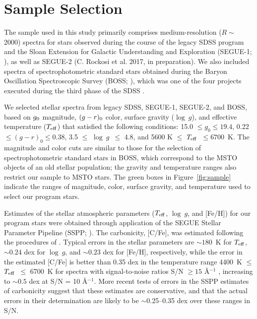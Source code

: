 \documentclass[iop]{emulateapj}
\newcommand*{\teff}{$T_{\rm eff}$}
\newcommand*{\logg}{$\log~g$}
\newcommand*{\feh}{[Fe/H]}
\newcommand*{\cfe}{[C/Fe]}
\begin{document}
\section{Sample Selection}

The sample used in this study primarily comprises medium-resolution ($R
\sim$ 2000) spectra for stars observed during the course of the legacy
SDSS program and the Sloan Extension for Galactic Understanding and
Exploration (SEGUE-1; \citealt{yanny2009}), as well as SEGUE-2 (C. Rockosi
et al. 2017, in preparation). We also included spectra of spectrophotometric
standard stars obtained during the Baryon Oscillation Spectroscopic
Survey (BOSS; \citealt{dawson2013}), which was one of the four projects
executed during the third phase of the SDSS \citep{alam2015}.

We selected stellar spectra from legacy SDSS, SEGUE-1, SEGUE-2, and
BOSS, based on $g_{\rm 0}$ magnitude, $(g-r) _{\rm 0}$ color, surface
gravity (\logg), and effective temperature (\teff) that satisfied the
following conditions: 15.0 $ \leq g_{0} \leq 19.4$, 0.22 $\leq (g-r)_{0}
\leq 0.38$, 3.5 $\leq$ \logg\ $\leq$ 4.8, and 5600 K $\leq $ \teff\
$\leq 6700$~K. The magnitude and color cuts are similar to those for the
selection of spectrophotometric standard stars in BOSS, which correspond
to the MSTO objects of an old stellar population; the gravity and
temperature ranges also restrict our sample to MSTO stars. The green boxes in
Figure~\ref{fig:sample} indicate the ranges of magnitude, color,
surface gravity, and temperature used to select our program stars.

Estimates of the stellar atmospheric parameters (\teff, \logg, and \feh)
for our program stars were obtained through application of the SEGUE
Stellar Parameter Pipeline (SSPP; \citealt{lee2008a, lee2008b,
allendeprieto2008, lee2011, smolinski2011}). The carbonicity, \cfe, was
estimated following the procedures of \citet{lee2013}. Typical errors in
the stellar parameters are $\sim 180$~K for \teff, $\sim 0.24$ dex for
\logg, and $\sim 0.23$ dex for \feh, respectively, while the error in
the estimated [C/Fe] is better than 0.35 dex in the temperature range
4400~K $\leq$ \teff\ $\leq$ 6700~K for spectra with signal-to-noise
ratios S/N $\geq 15$ \AA$^{-1}$ \citep{lee2013}, increasing to $\sim
0.5$ dex at S/N = 10 \AA$^{-1}$. More recent tests of errors in the SSPP
estimates of carbonicity suggest that these estimates are conservative,
and that the actual errors in their determination are likely to be
$\sim$0.25--0.35 dex over these ranges in S/N.
\end{document}
